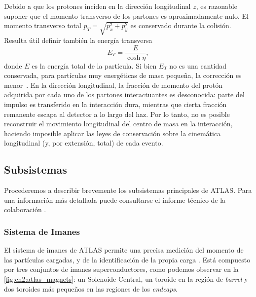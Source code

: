 Debido a que los protones inciden en la dirección longitudinal $z$, es razonable suponer que el momento transverso de los partones es aproximadamente nulo. El momento transverso total $p_T = \sqrt{p_x^2 + p_y^2}$ es conservado durante la colisión. Resulta útil definir también la energía transversa
\[ E_T = \frac{E}{\cosh\eta}, \]
donde $E$ es la energía total de la partícula. Si bien $E_T$ no es una cantidad conservada, para partículas muy energéticas de masa pequeña, la corrección es menor~\cite{gallicchio2018quit}. En la dirección longitudinal, la fracción de momento del protón adquirida por cada uno de los partones interactuantes es desconocida: parte del impulso es transferido en la interacción dura, mientras que cierta fracción remanente escapa al detector a lo largo del haz. Por lo tanto, no es posible reconstruir el movimiento longitudinal del centro de masa en la interacción, haciendo imposible aplicar las leyes de conservación sobre la cinemática longitudinal (y, por extensión, total) de cada evento.


\subsection{Subsistemas}

Procederemos a describir brevemente los subsistemas principales de ATLAS. Para una información más detallada puede consultarse el informe técnico de la colaboración \cite{Aad2008}.

\subsubsection{Sistema de Imanes}

El sistema de imanes de ATLAS permite una precisa medición del momento de las partículas cargadas, y de la identificación de la propia carga \cite{TenKate1999}. Está compuesto por tres conjuntos de imanes superconductores, como podemos observar en la \cref{fig:ch2:atlas_magnets}: un Solenoide Central, un toroide en la región de \textit{barrel} y dos toroides más pequeños en las regiones de los \textit{endcaps}.

